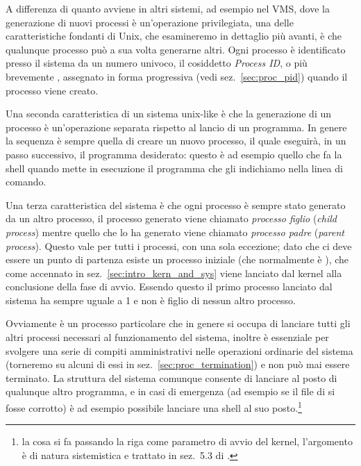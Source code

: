 A differenza di quanto avviene in altri sistemi, ad esempio nel VMS, dove la
generazione di nuovi processi è un'operazione privilegiata, una delle
caratteristiche fondanti di Unix, che esamineremo in dettaglio più avanti, è
che qualunque processo può a sua volta generarne altri. Ogni processo è
identificato presso il sistema da un numero univoco, il cosiddetto
\textit{Process ID}, o più brevemente , assegnato in forma
progressiva (vedi sez.~\ref{sec:proc_pid}) quando il processo viene creato.

Una seconda caratteristica di un sistema unix-like è che la generazione di un
processo è un'operazione separata rispetto al lancio di un programma. In
genere la sequenza è sempre quella di creare un nuovo processo, il quale
eseguirà, in un passo successivo, il programma desiderato: questo è ad esempio
quello che fa la shell quando mette in esecuzione il programma che gli
indichiamo nella linea di comando.

Una terza caratteristica del sistema è che ogni processo è sempre stato
generato da un altro processo, il processo generato viene chiamato
\textit{processo figlio} (\textit{child process}) mentre quello che lo ha
generato viene chiamato \textsl{processo padre} (\textit{parent
  process}). Questo vale per tutti i processi, con una sola eccezione; dato
che ci deve essere un punto di partenza esiste un processo iniziale (che
normalmente è ), che come accennato in
sez.~\ref{sec:intro_kern_and_sys} viene lanciato dal kernel alla conclusione
della fase di avvio. Essendo questo il primo processo lanciato dal sistema ha
sempre  uguale a 1 e non è figlio di nessun altro processo.

Ovviamente  è un processo particolare che in genere si occupa di
lanciare tutti gli altri processi necessari al funzionamento del sistema,
inoltre  è essenziale per svolgere una serie di compiti
amministrativi nelle operazioni ordinarie del sistema (torneremo su alcuni di
essi in sez.~\ref{sec:proc_termination}) e non può mai essere terminato. La
struttura del sistema comunque consente di lanciare al posto di 
qualunque altro programma, e in casi di emergenza (ad esempio se il file di
 si fosse corrotto) è ad esempio possibile lanciare una shell al suo
posto.\footnote{la cosa si fa passando la riga  come
  parametro di avvio del kernel, l'argomento è di natura sistemistica e
  trattato in sez.~5.3 di \cite{AGL}.}

